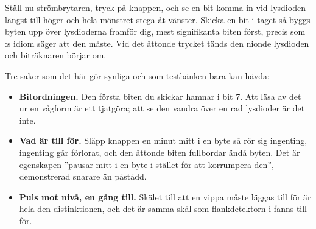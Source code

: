 Ställ nu strömbrytaren, tryck på knappen, och se en bit komma in vid lysdioden längst till höger
och hela mönstret stega åt vänster. Skicka  en bit i taget så byggs byten upp över
lysdioderna framför dig, mest signifikanta biten först, precis som :s idiom
säger att den måste. Vid det åttonde trycket tänds den nionde lysdioden och biträknaren börjar om.

Tre saker som det här gör synliga och som testbänken bara kan hävda:
\begin{itemize}
  \item \textbf{Bitordningen.} Den första biten du skickar hamnar i bit 7. Att läsa av det ur en
    vågform är ett tjatgöra; att se den vandra över en rad lysdioder är det inte.
  \item \textbf{Vad  är till för.} Släpp knappen en minut mitt i en byte så rör
    sig ingenting, ingenting går förlorat, och den åttonde biten fullbordar ändå byten. Det är
    egenskapen ”pausar mitt i en byte i stället för att korrumpera den”, demonstrerad snarare än
    påstådd.
  \item \textbf{Puls mot nivå, en gång till.} Skälet till att en vippa måste läggas till för
     är hela den distinktionen, och det är samma skäl som flankdetektorn i
     fanns till för.
\end{itemize}
